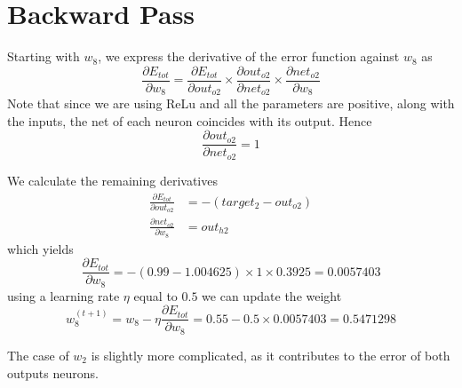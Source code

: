 \documentclass[a4paper]{article}
\begin{document}
\section{Backward Pass}
Starting with $w_8$, we express the derivative of the error function against $w_8$ as
\begin{equation}
    \frac{\partial E_{tot}}{\partial w_8} = \frac{\partial E_{tot}}{\partial out_{o2}} \times \frac{\partial out_{o2}}{\partial net_{o2}} \times \frac{\partial net_{o2}}{\partial w_8}
\end{equation}
Note that since we are using ReLu and all the parameters are positive, along with the inputs, the net of each neuron coincides with its output. Hence
\begin{equation}
    \frac{\partial out_{o2}}{\partial net_{o2}} = 1
\end{equation}

We calculate the remaining derivatives
\begin{equation*}
\begin{split}
    \frac{\partial E_{tot}}{\partial out_{o2}} &= -(target_2 - out_{o2})\\
    \frac{\partial net_{o2}}{\partial w_8} &= out_{h2}
\end{split}
\end{equation*}
which yields
\begin{equation}
    \frac{\partial E_{tot}}{\partial w_8} = - (0.99 - 1.004625) \times 1 \times 0.3925 = 0.0057403
\end{equation}
using a learning rate $\eta$ equal to $0.5$ we can update the weight
\begin{equation}
    w_{8}^{(t+1)} = w_8 - \eta \frac{\partial E_{tot}}{\partial w_8}  =  0.55 - 0.5 \times 0.0057403 = 0.5471298
\end{equation}

The case of $w_2$ is slightly more complicated, as it contributes to the error of both outputs neurons.
\end{document}
